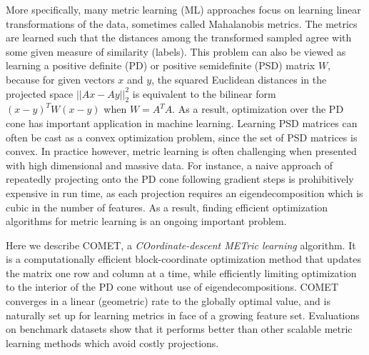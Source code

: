 \documentclass{article} %
\newcommand\mat[1]{{#1}}
\newcommand{\W}{\mat{W}}
\newcommand{\ignore}[1]{}
\begin{document}
More specifically, many metric learning (ML) approaches focus on learning linear transformations of the data, sometimes called Mahalanobis metrics. The metrics are learned such that the distances among the transformed sampled agree with some given measure of similarity (labels). This problem can also be viewed as learning a positive definite (PD) or positive semidefinite (PSD) matrix $\W$, because for given vectors $x$ and $y$, the squared Euclidean distances in the projected space $||Ax-Ay||^2_2$ is equivalent to the bilinear form $(x-y)^T\W(x-y)$ when $\W=A^TA$. As a result, optimization over the PD cone has important application in machine learning. 
Learning PSD matrices can often be cast as a convex optimization problem, since the set of PSD matrices is convex. In practice however, metric learning is often challenging when presented with high dimensional and massive data. For instance, a naive approach of repeatedly projecting onto the PD cone following gradient steps is prohibitively expensive in run time, as each projection requires an eigendecomposition which is cubic in the number of features. As a result, finding efficient optimization algorithms for metric learning is an ongoing important problem.

\ignore{
Furthermore an important challenge for metric learning is the case where the set of features is not fixed in advance, but changes with time. This is a typical scenario in many real life applications of learning: as more data accumulates, it is possible to estimate more parameters accurately, so more features and signals are gradually added to existing systems. It is therefore desirable to develop algorithms that can learn metrics in face of a growing feature set. 
}

Here we describe COMET, a {\em{COordinate-descent METric learning}} algorithm. It is a computationally efficient block-coordinate optimization method that updates the matrix one row and column at a time, while efficiently limiting optimization to the interior of the PD cone without use of eigendecompositions. COMET converges in a linear (geometric) rate to the globally optimal value, and is naturally set up for learning metrics in face of a growing feature set. Evaluations on benchmark datasets show that it performs better than other scalable metric learning methods which avoid costly projections. 

\end{document}
